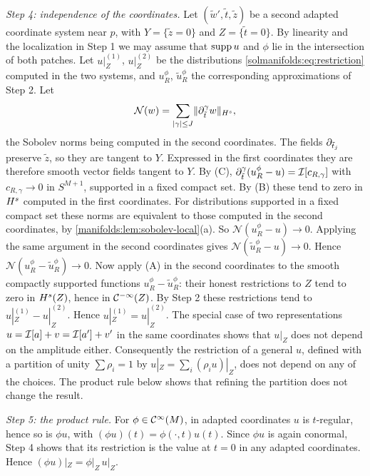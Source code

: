 \emph{Step 4: independence of the coordinates.} Let $(\tilde w',\tilde t,\tilde z)$ be a
second adapted coordinate system near $p$, with $Y=\{\tilde z=0\}$ and $Z=\{\tilde t=0\}$. By
linearity and the localization in Step 1 we may assume that $\operatorname{supp} u$ and $\phi$ lie in the
intersection of both patches. Let $u|_Z^{(1)}$, $u|_Z^{(2)}$ be the distributions
\eqref{solmanifolds:eq:restriction} computed in the two systems, and $u^\phi_R$,
$\tilde u^\phi_R$ the corresponding approximations of Step 2. Let
\begin{equation*}
\mathcal N(w)=\sum_{\lvert \gamma\rvert\le J}\lVert \partial_{\tilde t}^\gamma w\rVert_{H^{s}},
\end{equation*}
the Sobolev norms being computed in the second coordinates. The fields $\partial_{\tilde t_j}$
preserve $\tilde z$, so they are tangent to $Y$. Expressed in the first coordinates they
are therefore smooth vector fields tangent to $Y$. By (C),
$\partial_{\tilde t}^\gamma(u^\phi_R-u)=\mathcal{I}[c_{R,\gamma}]$ with $c_{R,\gamma}\to0$ in $S^{M+1}$,
supported in a fixed compact set. By (B) these tend to zero in $H^{s}$ computed in the
first coordinates. For distributions supported in a fixed compact set these norms are
equivalent to those computed in the second coordinates, by
\cref{manifolds:lem:sobolev-local}(a). So $\mathcal N(u^\phi_R-u)\to0$. Applying the same
argument in the second coordinates gives $\mathcal N(\tilde u^\phi_R-u)\to0$. Hence
$\mathcal N(u^\phi_R-\tilde u^\phi_R)\to0$. Now apply (A) in the second coordinates to the smooth
compactly supported functions $u^\phi_R-\tilde u^\phi_R$: their honest restrictions to $Z$
tend to zero in $H^{s}(Z)$, hence in $\mathcal{C}^{-\infty}(Z)$. By Step 2 these restrictions tend to
$u|_Z^{(1)}-u|_Z^{(2)}$. Hence $u|_Z^{(1)}=u|_Z^{(2)}$. The special case of two
representations $u=\mathcal{I}[a]+v=\mathcal{I}[a']+v'$ in the same coordinates shows that $u|_Z$ does
not depend on the amplitude either. Consequently the restriction of a general $u$,
defined with a partition of unity $\sum\rho_i=1$ by $u|_Z=\sum_i(\rho_iu)|_Z$, does not depend
on any of the choices. The product rule below shows that refining the partition does not
change the result.

\emph{Step 5: the product rule.} For $\phi\in\mathcal{C}^\infty(M)$, in adapted coordinates $u$ is
$t$-regular, hence so is $\phi u$, with $(\phi u)(t)=\phi(\cdot,t)u(t)$. Since $\phi u$ is again
conormal, Step 4 shows that its restriction is the value at $t=0$ in any adapted
coordinates. Hence $(\phi u)|_Z=\phi|_Z\,u|_Z$.

